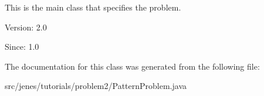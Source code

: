 This is the main class that specifies the problem.

\begin{Desc}
\item[Version:]2.0 \end{Desc}
\begin{Desc}
\item[Since:]1.0 \end{Desc}


The documentation for this class was generated from the following file:\begin{CompactItemize}
\item 
src/jenes/tutorials/problem2/PatternProblem.java\end{CompactItemize}
